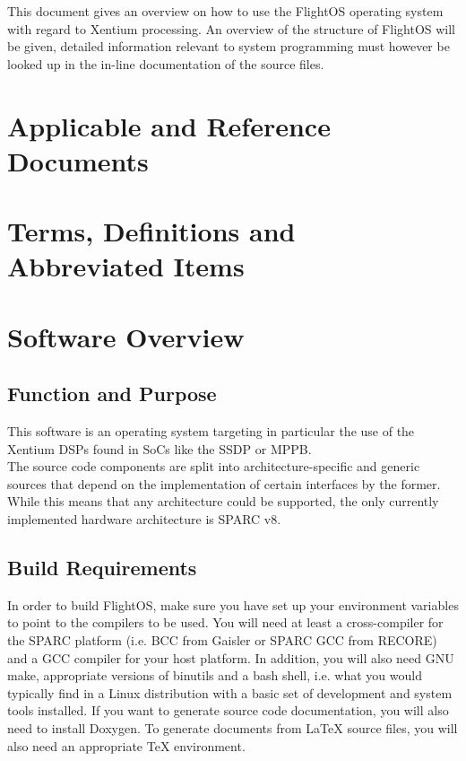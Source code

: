 This document gives an overview on how to use the FlightOS operating system with
regard to Xentium processing. An overview of the structure of FlightOS will be
given, detailed information relevant to system programming must however be 
looked up in the in-line documentation of the source files.

\chapter{Applicable and Reference Documents} %

\printbibliography[heading=none]


\chapter{Terms, Definitions and Abbreviated Items}
\printglossary[type=acronym]
\printglossary[type=main, style=altlist]



\chapter{Software Overview}

\section{Function and Purpose}

This software is an operating system targeting in particular the use of the
Xentium DSPs found in \glspl{SoC} like the \gls{SSDP} or \gls{MPPB}.
\\

The source code components are split into architecture-specific and generic
sources that depend on the implementation of certain interfaces by the former.
While this means that any architecture could be supported, the only
currently implemented hardware architecture is \gls{SPARC} v8.


\section {Build Requirements}

In order to build FlightOS, make sure you have set up your environment variables
to point to the compilers to be used. You will need at least a cross-compiler
for the \gls{SPARC} platform (i.e. BCC from Gaisler or SPARC GCC from RECORE)
and a \gls{GCC} compiler for your host platform. In addition, you will 
also need GNU make, appropriate versions of binutils and a bash shell, i.e.
what you would typically find in a Linux distribution with a basic set of
development and system tools installed. If you want to generate source code
documentation, you will also need to install \gls{Doxygen}. To generate
documents from LaTeX source files, you will also need an appropriate TeX
environment.

